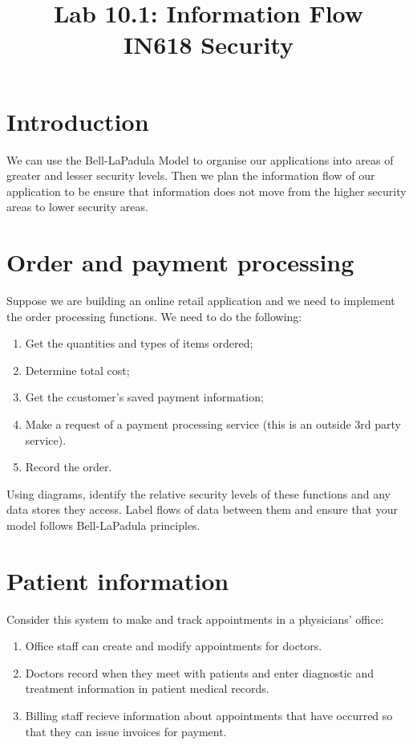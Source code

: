 \documentclass{article}
\begin{document}
\title{ Lab 10.1: Information Flow \\ IN618 Security}
\maketitle

\section*{Introduction}
We can use the Bell-LaPadula Model to organise our applications into areas of greater and lesser security levels. Then we plan the information flow of our application to be ensure that information does not move from the higher security areas to lower security areas.

\section{Order and payment processing}
Suppose we are building an online retail application and we need to implement the order processing functions.  We need to do the following:
\begin{enumerate}
	\item Get the quantities and types of items ordered;
	\item Determine total cost;
	\item Get the ccustomer's saved payment information;
	\item Make a request of a payment processing service (this is an outside 3rd party service).
	\item Record the order.
\end{enumerate}

Using diagrams, identify the relative security levels of these functions and any data stores they access.  Label flows of data between them and ensure that your model follows Bell-LaPadula principles.

\newpage

\section{Patient information}  
Consider this system to make and track appointments in a physicians' office:
\begin{enumerate}
	\item Office staff can create and modify appointments for doctors.
	\item Doctors record when they meet with patients and enter diagnostic and treatment information in patient medical records.
	\item Billing staff recieve information about appointments that have occurred so that they can issue invoices for payment.
\end{enumerate}
\end{document}
